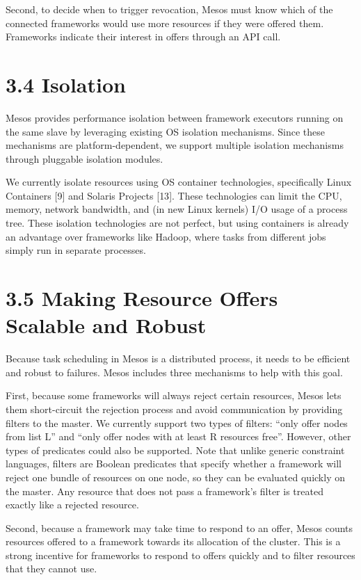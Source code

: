 \documentclass[
]{article}
\begin{document}
Second, to decide when to trigger revocation, Mesos must know which of
the connected frameworks would use more resources if they were offered
them. Frameworks indicate their interest in offers through an API call.

\section{3.4 Isolation}\label{isolation}

Mesos provides performance isolation between framework executors running
on the same slave by leveraging existing OS isolation mechanisms. Since
these mechanisms are platform-dependent, we support multiple isolation
mechanisms through pluggable isolation modules.

We currently isolate resources using OS container technologies,
specifically Linux Containers {[}9{]} and Solaris Projects {[}13{]}.
These technologies can limit the CPU, memory, network bandwidth, and (in
new Linux kernels) I/O usage of a process tree. These isolation
technologies are not perfect, but using containers is already an
advantage over frameworks like Hadoop, where tasks from different jobs
simply run in separate processes.

\section{3.5 Making Resource Offers Scalable and
Robust}\label{making-resource-offers-scalable-and-robust}

Because task scheduling in Mesos is a distributed process, it needs to
be efficient and robust to failures. Mesos includes three mechanisms to
help with this goal.

First, because some frameworks will always reject certain resources,
Mesos lets them short-circuit the rejection process and avoid
communication by providing filters to the master. We currently support
two types of filters: ``only offer nodes from list L'' and ``only offer
nodes with at least R resources free''. However, other types of
predicates could also be supported. Note that unlike generic constraint
languages, filters are Boolean predicates that specify whether a
framework will reject one bundle of resources on one node, so they can
be evaluated quickly on the master. Any resource that does not pass a
framework's filter is treated exactly like a rejected resource.

Second, because a framework may take time to respond to an offer, Mesos
counts resources offered to a framework towards its allocation of the
cluster. This is a strong incentive for frameworks to respond to offers
quickly and to filter resources that they cannot use.
\end{document}
